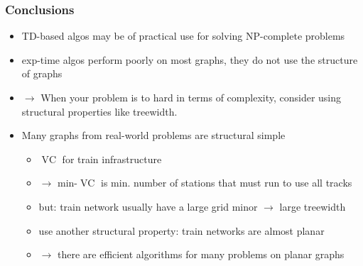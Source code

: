 \documentclass[11pt]{beamer}
\DeclareMathOperator{\VC}{VC}
\begin{document}
\begin{frame}
\frametitle{Conclusions}

\begin{itemize}
\item TD-based algos may be of practical use for solving NP-complete problems
\item exp-time algos perform poorly on most graphs, they do not use the structure of graphs
\vspace*{0.3cm}
\item [] $\rightarrow$ When your problem is to hard in terms of complexity, consider using structural properties like treewidth.
\vspace*{0.3cm}
\item [] Many graphs from real-world problems are structural simple
\begin{itemize}
\item $\VC$ for train infrastructure
\item [] $\rightarrow$ min-$\VC$ is min. number of stations that must run to use all tracks
\item but: train network usually have a large grid minor $\rightarrow$ large treewidth
\item use another structural property: train networks are almost planar
\item [] $\rightarrow$ there are efficient algorithms for many problems on planar graphs
\end{itemize} 
\end{itemize}

\end{frame}
\end{document}
